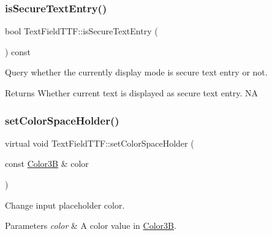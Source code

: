 \subsubsection{\texorpdfstring{is\+Secure\+Text\+Entry()}{isSecureTextEntry()}\hspace{0.1cm}{\footnotesize\ttfamily [2/2]}}
{\footnotesize\ttfamily bool Text\+Field\+T\+T\+F\+::is\+Secure\+Text\+Entry (\begin{DoxyParamCaption}{ }\end{DoxyParamCaption}) const\hspace{0.3cm}{\ttfamily [virtual]}}

Query whether the currently display mode is secure text entry or not. \begin{DoxyReturn}{Returns}
Whether current text is displayed as secure text entry.  NA 
\end{DoxyReturn}
\mbox{\label{classTextFieldTTF_a64ca9201c9b9c2a09200341c5db244f0}} 
\subsubsection{\texorpdfstring{set\+Color\+Space\+Holder()}{setColorSpaceHolder()}\hspace{0.1cm}{\footnotesize\ttfamily [1/4]}}
{\footnotesize\ttfamily virtual void Text\+Field\+T\+T\+F\+::set\+Color\+Space\+Holder (\begin{DoxyParamCaption}\item[{const \hyperlink{structColor3B}{Color3B} \&}]{color }\end{DoxyParamCaption})\hspace{0.3cm}{\ttfamily [virtual]}}



Change input placeholder color. 


\begin{DoxyParams}{Parameters}
{\em color} & A color value in {\ttfamily \hyperlink{structColor3B}{Color3B}}. \\
\hline
\end{DoxyParams}
\mbox{\label{classTextFieldTTF_a0669ba28e14284524a2027fcd7fed71e}} 

